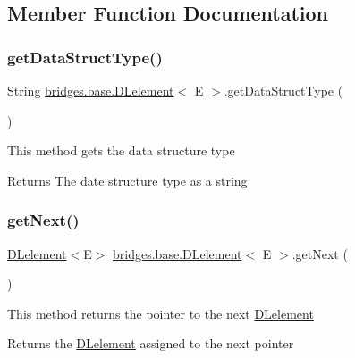 \subsection{Member Function Documentation}
\hypertarget{classbridges_1_1base_1_1_d_lelement_a4a0e8f7bd377a652927a741e70aae6d3}{}\label{classbridges_1_1base_1_1_d_lelement_a4a0e8f7bd377a652927a741e70aae6d3} 
\subsubsection{\texorpdfstring{get\+Data\+Struct\+Type()}{getDataStructType()}}
{\footnotesize\ttfamily String \hyperlink{classbridges_1_1base_1_1_d_lelement}{bridges.\+base.\+D\+Lelement}$<$ E $>$.get\+Data\+Struct\+Type (\begin{DoxyParamCaption}{ }\end{DoxyParamCaption})}

This method gets the data structure type

\begin{DoxyReturn}{Returns}
The date structure type as a string 
\end{DoxyReturn}
\hypertarget{classbridges_1_1base_1_1_d_lelement_a35e88e8d991d6f23ec63b3ef3f6cce4e}{}\label{classbridges_1_1base_1_1_d_lelement_a35e88e8d991d6f23ec63b3ef3f6cce4e} 
\subsubsection{\texorpdfstring{get\+Next()}{getNext()}}
{\footnotesize\ttfamily \hyperlink{classbridges_1_1base_1_1_d_lelement}{D\+Lelement}$<$E$>$ \hyperlink{classbridges_1_1base_1_1_d_lelement}{bridges.\+base.\+D\+Lelement}$<$ E $>$.get\+Next (\begin{DoxyParamCaption}{ }\end{DoxyParamCaption})}

This method returns the pointer to the next \hyperlink{classbridges_1_1base_1_1_d_lelement}{D\+Lelement} \begin{DoxyReturn}{Returns}
the \hyperlink{classbridges_1_1base_1_1_d_lelement}{D\+Lelement} assigned to the next pointer 
\end{DoxyReturn}
\hypertarget{classbridges_1_1base_1_1_d_lelement_a859f08f38513ecdfff0eb11bd2b98ce7}{}\label{classbridges_1_1base_1_1_d_lelement_a859f08f38513ecdfff0eb11bd2b98ce7} 
